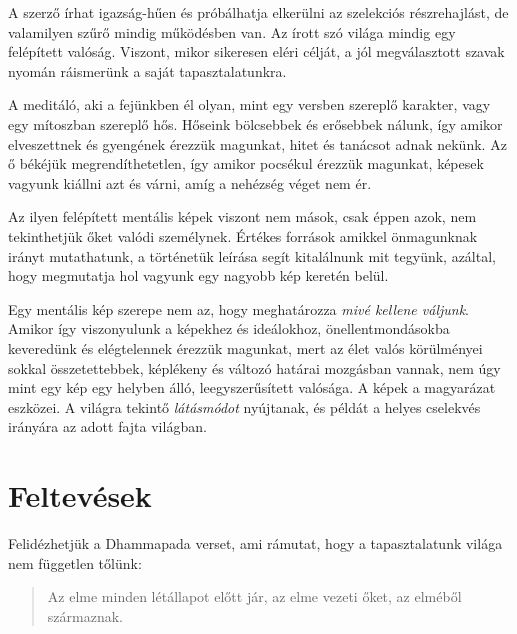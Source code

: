 A szerző írhat igazság-hűen és próbálhatja elkerülni az szelekciós
részrehajlást, de valamilyen szűrő mindig működésben van. Az írott szó
világa mindig egy felépített valóság. Viszont, mikor sikeresen eléri
célját, a jól megválasztott szavak nyomán ráismerünk a saját
tapasztalatunkra.

\clearpage

\vspace*{-\baselineskip}


A meditáló, aki a fejünkben él olyan, mint egy versben szereplő
karakter, vagy egy mítoszban szereplő hős. Hőseink bölcsebbek és
erősebbek nálunk, így amikor elveszettnek és gyengének érezzük magunkat,
hitet és tanácsot adnak nekünk. Az ő békéjük megrendíthetetlen, így
amikor pocsékul érezzük magunkat, képesek vagyunk kiállni azt és várni,
amíg a nehézség véget nem ér.

Az ilyen felépített mentális képek viszont nem mások, csak éppen azok,
nem tekinthetjük őket valódi személynek. Értékes források amikkel
önmagunknak irányt mutathatunk, a történetük leírása segít kitalálnunk
mit tegyünk, azáltal, hogy megmutatja hol vagyunk egy nagyobb kép
keretén belül.

Egy mentális kép szerepe nem az, hogy meghatározza \emph{mivé kellene
váljunk}. Amikor így viszonyulunk a képekhez és ideálokhoz,
önellentmondásokba keveredünk és elégtelennek érezzük magunkat, mert az
élet valós körülményei sokkal összetettebbek, képlékeny és változó
határai mozgásban vannak, nem úgy mint egy kép egy helyben álló,
leegyszerűsített valósága. A képek a magyarázat eszközei. A világra
tekintő \emph{látásmódot} nyújtanak, és példát a helyes cselekvés
irányára az adott fajta világban.

\clearpage

\section{Feltevések}


\noindent Felidézhetjük a Dhammapada verset, ami rámutat, hogy a
tapasztalatunk világa nem független tőlünk:

\begin{quote}
Az elme minden létállapot előtt jár, az elme vezeti őket, az elméből
származnak.

\bigskip

\end{quote}

